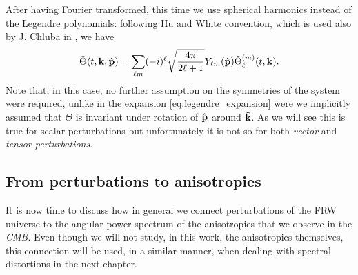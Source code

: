After having Fourier transformed, this time we use spherical harmonics instead of the Legendre polynomials: following Hu and White \cite{HuWhite} convention, which is used also by J. Chluba in \cite{Chluba_tens_diss}, we have
\begin{equation}
    \label{eq:TensorMultipoleExpansion}
    \tilde\Theta(t,\mathbf k,\mathbf{\hat{p}})=\sum_{\ell m} (-i)^{\ell}\sqrt{\frac{4\pi}{2\ell+1}}Y_{\ell m}(\mathbf{\hat{p}})\tilde\Theta_{\ell}^{(m)}(t,\mathbf k).
\end{equation}
Note that, in this case, no further assumption on the symmetries of the system were required, unlike in the expansion \ref{eq:legendre_expansion} were we implicitly assumed that $\Theta$ is invariant under rotation of $\mathbf{\hat{p}}$ around $\mathbf{\hat{k}}$. As we will see this is true for scalar perturbations but unfortunately it is not so for both \emph{vector} and \emph{tensor perturbations}. 
\subsection{From perturbations to anisotropies}\label{sec:PertToAnis}
It is now time to discuss how in general we connect perturbations of the FRW universe to the angular power spectrum of the anisotropies that we observe in the \emph{CMB}. Even though we will not study, in this work, the anisotropies themselves, this connection will be used, in a similar manner, when dealing with spectral distortions in the next chapter. 

